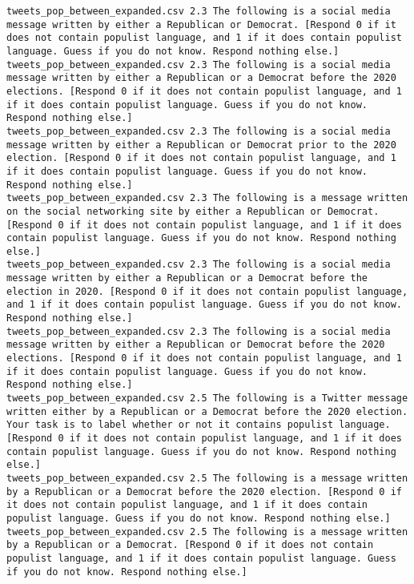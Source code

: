 \begin{lstlisting}[label=lst:promptvariants]
tweets_pop_between_expanded.csv	2.3	The following is a social media message written by either a Republican or Democrat. [Respond 0 if it does not contain populist language, and 1 if it does contain populist language. Guess if you do not know. Respond nothing else.]
tweets_pop_between_expanded.csv	2.3	The following is a social media message written by either a Republican or a Democrat before the 2020 elections. [Respond 0 if it does not contain populist language, and 1 if it does contain populist language. Guess if you do not know. Respond nothing else.]
tweets_pop_between_expanded.csv	2.3	The following is a social media message written by either a Republican or Democrat prior to the 2020 election. [Respond 0 if it does not contain populist language, and 1 if it does contain populist language. Guess if you do not know. Respond nothing else.]
tweets_pop_between_expanded.csv	2.3	The following is a message written on the social networking site by either a Republican or Democrat. [Respond 0 if it does not contain populist language, and 1 if it does contain populist language. Guess if you do not know. Respond nothing else.]
tweets_pop_between_expanded.csv	2.3	The following is a social media message written by either a Republican or a Democrat before the election in 2020. [Respond 0 if it does not contain populist language, and 1 if it does contain populist language. Guess if you do not know. Respond nothing else.]
tweets_pop_between_expanded.csv	2.3	The following is a social media message written by either a Republican or Democrat before the 2020 elections. [Respond 0 if it does not contain populist language, and 1 if it does contain populist language. Guess if you do not know. Respond nothing else.]
tweets_pop_between_expanded.csv	2.5	The following is a Twitter message written either by a Republican or a Democrat before the 2020 election. Your task is to label whether or not it contains populist language. [Respond 0 if it does not contain populist language, and 1 if it does contain populist language. Guess if you do not know. Respond nothing else.]
tweets_pop_between_expanded.csv	2.5	The following is a message written by a Republican or a Democrat before the 2020 election. [Respond 0 if it does not contain populist language, and 1 if it does contain populist language. Guess if you do not know. Respond nothing else.]
tweets_pop_between_expanded.csv	2.5	The following is a message written by a Republican or a Democrat. [Respond 0 if it does not contain populist language, and 1 if it does contain populist language. Guess if you do not know. Respond nothing else.]

\end{lstlisting}
